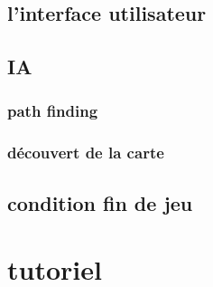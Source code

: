\documentclass[a4paper 12pts]{article}
\begin{document}
 
\subsection{l'interface utilisateur}

\subsection{IA}

\subsubsection{path finding}

\subsubsection{découvert de la carte}

\subsection{condition fin de jeu}





\section{tutoriel}
\end{document}

